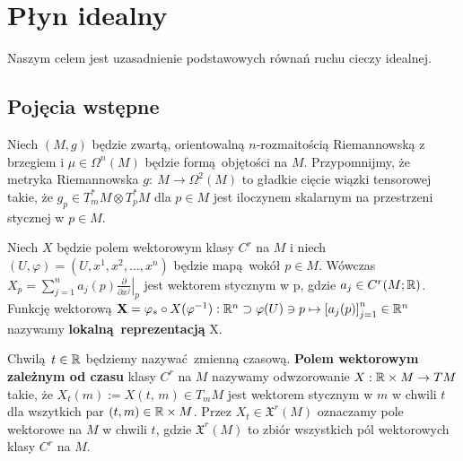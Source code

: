 \chapter{Płyn idealny} Naszym celem jest uzasadnienie podstawowych równań ruchu cieczy idealnej.

\section{Pojęcia wstępne}

Niech \((M, g)\) będzie zwartą, orientowalną \(n\)-rozmaitością Riemannowską z brzegiem i \(\mu \in \Omega^n(M)\) będzie formą objętości na \(M\). Przypomnijmy, że metryka Riemannowska \(g:\: M \rightarrow \Omega^2(M)\) to gładkie cięcie wiązki tensorowej takie, że \(g_p \in T_m^{\ast} M \otimes T_p^{\ast} M\) dla \(p\in M\) jest iloczynem skalarnym na przestrzeni stycznej w \(p\in M\).

Niech \(X\) będzie polem wektorowym klasy \(C^r\) na \(M\) i niech \((U, \varphi) = (U, x^1, x^2, \dots, x^n)\) będzie mapą wokół \(p\in M\). Wówczas \(X_p = \sum_{j=1}^{n}a_j(p)\left.\frac{\partial}{\partial x^j}\right|_p\) jest wektorem stycznym w p, gdzie \(a_j\in C^r(M; \mathbb{R})\). Funkcję wektorową \(\mathbf{X} = \varphi_{\ast}\circ X(\varphi^{-1}): \mathbb{R}^n \supset \varphi(U)\ni p \mapsto \left[a_j(p)\right]_{j=1}^n\in \mathbb{R}^n\) nazywamy \textbf{lokalną reprezentacją} X.

\begin{figure}[!h]
\centering
{}
\end{figure}


Chwilą \(t\in\mathbb{R}\) będziemy nazywać zmienną czasową. \textbf{Polem wektorowym zależnym od czasu} klasy \(C^r\) na \(M\) nazywamy odwzorowanie \(X:\mathbb{R}\times M\rightarrow TM\) takie, że \(X_t(m):=X(t,\,m) \in T_{m} M\) jest wektorem stycznym w \(m\) w chwili \(t\) dla wszytkich par \((t, m) \in \mathbb{R} \times M\). Przez \(X_t\in \mathfrak{X}^r(M)\) oznaczamy pole wektorowe na \(M\) w chwili \(t\), gdzie \(\mathfrak{X}^r(M)\) to zbiór wszystkich pól wektorowych klasy \(C^r\) na \(M\). 

